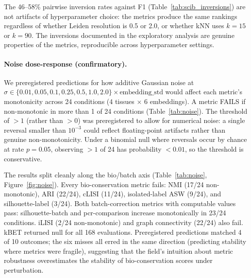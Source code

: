 \documentclass[10pt,letterpaper]{article}
\begin{document}
The 46--58\% pairwise inversion rates against F1 (Table~\ref{tab:scib_inversions}) are not artifacts of hyperparameter choice: the metrics produce the same rankings regardless of whether Leiden resolution is 0.5 or 2.0, or whether kNN uses $k = 15$ or $k = 90$. The inversions documented in the exploratory analysis are genuine properties of the metrics, reproducible across hyperparameter settings.

\paragraph{Noise dose-response (confirmatory).} We preregistered predictions for how additive Gaussian noise at $\sigma \in \{0.01, 0.05, 0.1, 0.25, 0.5, 1.0, 2.0\} \times \text{embedding\_std}$ would affect each metric's monotonicity across 24 conditions (4 tissues $\times$ 6 embeddings). A metric FAILS if non-monotonic in more than 1 of 24 conditions (Table~\ref{tab:noise}). The threshold of $>1$ (rather than $>0$) was preregistered to allow for numerical noise: a single reversal smaller than $10^{-3}$ could reflect floating-point artifacts rather than genuine non-monotonicity. Under a binomial null where reversals occur by chance at rate $p = 0.05$, observing $>1$ of 24 has probability $< 0.01$, so the threshold is conservative.

The results split cleanly along the bio/batch axis (Table~\ref{tab:noise}, Figure~\ref{fig:noise}). Every bio-conservation metric fails: NMI (17/24 non-monotonic), ARI (22/24), cLISI (11/24), isolated-label ASW (9/24), and silhouette-label (3/24). Both batch-correction metrics with computable values pass: silhouette-batch and pcr-comparison increase monotonically in 23/24 conditions. iLISI (2/24 non-monotonic) and graph connectivity (22/24) also fail. kBET returned null for all 168 evaluations. Preregistered predictions matched 4 of 10 outcomes; the six misses all erred in the same direction (predicting stability where metrics were fragile), suggesting that the field's intuition about metric robustness overestimates the stability of bio-conservation scores under perturbation.
\end{document}
